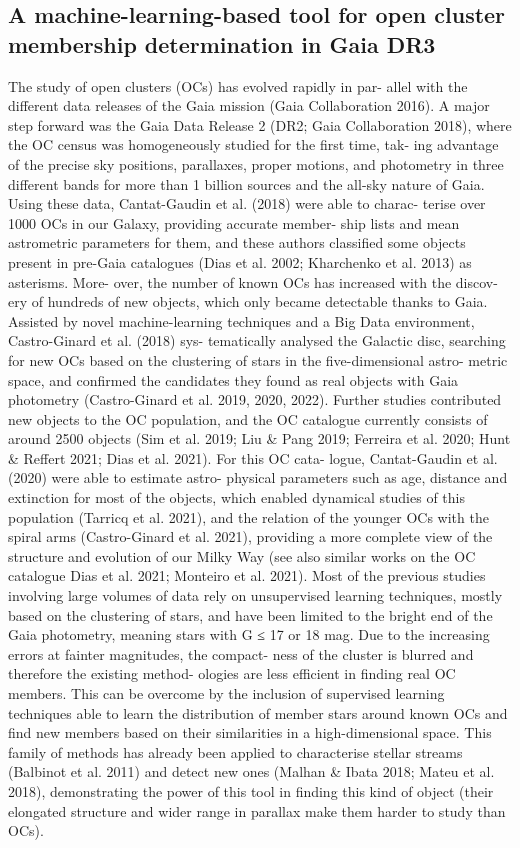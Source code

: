 \documentclass[../Main.tex]{subfiles}
\begin{document}
\subsection{A machine-learning-based tool for open cluster membership determination in Gaia DR3} %
The study of open clusters (OCs) has evolved rapidly in par- allel with the different data releases of the Gaia mission (Gaia Collaboration 2016). A major step forward was the Gaia Data Release 2 (DR2; Gaia Collaboration 2018), where the OC census was homogeneously studied for the first time, tak- ing advantage of the precise sky positions, parallaxes, proper motions, and photometry in three different bands for more than 1 billion sources and the all-sky nature of Gaia. Using these data, Cantat-Gaudin et al. (2018) were able to charac- terise over 1000 OCs in our Galaxy, providing accurate member- ship lists and mean astrometric parameters for them, and these authors classified some objects present in pre-Gaia catalogues (Dias et al. 2002; Kharchenko et al. 2013) as asterisms. More- over, the number of known OCs has increased with the discov- ery of hundreds of new objects, which only became detectable thanks to Gaia. Assisted by novel machine-learning techniques and a Big Data environment, Castro-Ginard et al. (2018) sys- tematically analysed the Galactic disc, searching for new OCs based on the clustering of stars in the five-dimensional astro- metric space, and confirmed the candidates they found as real objects with Gaia photometry (Castro-Ginard et al. 2019, 2020, 2022). Further studies contributed new objects to the OC population, and the OC catalogue currently consists of around 2500 objects (Sim et al. 2019; Liu \& Pang 2019; Ferreira et al. 2020; Hunt \& Reffert 2021; Dias et al. 2021). For this OC cata- logue, Cantat-Gaudin et al. (2020) were able to estimate astro- physical parameters such as age, distance and extinction for most of the objects, which enabled dynamical studies of this population (Tarricq et al. 2021), and the relation of the younger OCs with the spiral arms (Castro-Ginard et al. 2021), providing a more complete view of the structure and evolution of our Milky Way (see also similar works on the OC catalogue Dias et al. 2021; Monteiro et al. 2021). Most of the previous studies involving large volumes of data rely on unsupervised learning techniques, mostly based on the clustering of stars, and have been limited to the bright end of the Gaia photometry, meaning stars with G ≤ 17 or 18 mag. Due to the increasing errors at fainter magnitudes, the compact- ness of the cluster is blurred and therefore the existing method- ologies are less efficient in finding real OC members. This can be overcome by the inclusion of supervised learning techniques able to learn the distribution of member stars around known OCs and find new members based on their similarities in a high-dimensional space. This family of methods has already been applied to characterise stellar streams (Balbinot et al. 2011) and detect new ones (Malhan \& Ibata 2018; Mateu et al. 2018), demonstrating the power of this tool in finding this kind of object (their elongated structure and wider range in parallax make them harder to study than OCs).
\end{document}
